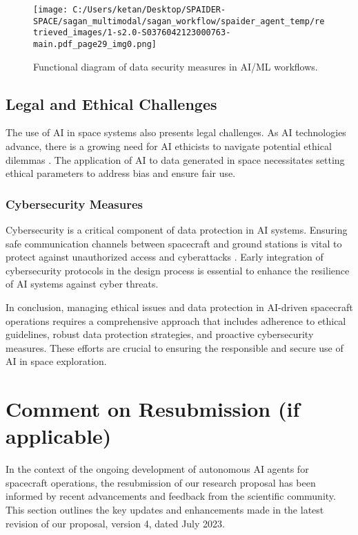 \documentclass[a4paper,12pt]{article}
\begin{document}
\begin{figure}[htbp]
    \centering
    \texttt{[image: C:/Users/ketan/Desktop/SPAIDER-SPACE/sagan\_multimodal/sagan\_workflow/spaider\_agent\_temp/retrieved\_images/1-s2.0-S0376042123000763-main.pdf\_page29\_img0.png]}
    \caption{Functional diagram of data security measures in AI/ML workflows.}
    \label{fig:data_security}
\end{figure}

\subsection{Legal and Ethical Challenges}

The use of AI in space systems also presents legal challenges. As AI technologies advance, there is a growing need for AI ethicists to navigate potential ethical dilemmas \cite{ai_ethicists_needed}. The application of AI to data generated in space necessitates setting ethical parameters to address bias and ensure fair use.

\subsubsection{Cybersecurity Measures}

Cybersecurity is a critical component of data protection in AI systems. Ensuring safe communication channels between spacecraft and ground stations is vital to protect against unauthorized access and cyberattacks \cite{cybersecurity_measures}. Early integration of cybersecurity protocols in the design process is essential to enhance the resilience of AI systems against cyber threats.

In conclusion, managing ethical issues and data protection in AI-driven spacecraft operations requires a comprehensive approach that includes adherence to ethical guidelines, robust data protection strategies, and proactive cybersecurity measures. These efforts are crucial to ensuring the responsible and secure use of AI in space exploration.






\section{Comment on Resubmission (if applicable)}

In the context of the ongoing development of autonomous AI agents for spacecraft operations, the resubmission of our research proposal has been informed by recent advancements and feedback from the scientific community. This section outlines the key updates and enhancements made in the latest revision of our proposal, version 4, dated July 2023.
\end{document}
